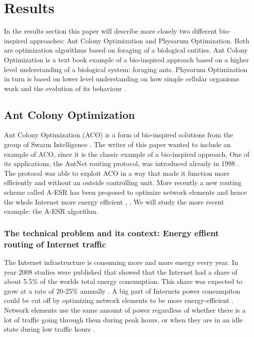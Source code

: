 \documentclass{IWORK2014}
\begin{document}
\section{Results}

In the results section this paper will describe more closely two different bio-inspired approaches: Ant Colony Optimization and Physarum Optimization. Both are optimization algorithms based on foraging of a biological entities. Ant Colony Optimization is a text book example of a bio-inspired approach based on a higher level understanding of a biological system: foraging ants. Physarum Optimization in turn is based on lower level understanding on how simple cellular organisms work and the evolution of its behaviour \cite{liu2012physarum}.

\subsection{Ant Colony Optimization}
Ant Colony Optimization (ACO) is a form of bio-inspired solutions from the group of Swarm Intelligence \cite{hylsberg2011bioinspired}. The writer of this paper wanted to include an example of ACO, since it is the classic example of a bio-inspired approach. One of its applications, the AntNet routing protocol, was introduced already in 1998 \cite{di1998antnet}. The protocol was able to exploit ACO in a way that made it function more efficiently and without an outside controlling unit. More recently a new routing scheme called A-ESR has been proposed to optimize network elements and hence the whole Internet more energy efficient \cite{kim2012ant}, \cite{kim2011ant}. We will study the more recent example: the A-ESR algorithm.

\subsubsection{The technical problem and its context: Energy effient routing of Internet traffic}
The Internet infrastructure is consuming more and more energy every year. In year 2008 studies were published that showed that the Internet had a share of about 5.5\% of the worlds total energy consumption. This share was expected to grow at a rate of 20-25\% annually \cite{proceedings2008energy}. A big part of Internets power consumpiton could be cut off by optimizing network elements to be more energy-efficient \cite{andrews2010routing}. Network elements use the same amount of power regardless of whether there is a lot of traffic going through them during peak hours, or when they are in an idle state during low traffic hours \cite{gupta2007using}.
\end{document}
